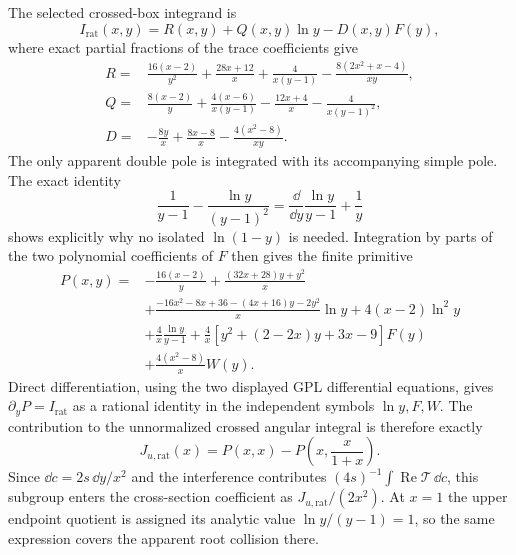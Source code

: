 The selected crossed-box integrand is
\begin{equation}
 I_{\mathrm{rat}}(x,y)=R(x,y)+Q(x,y)\ln y-D(x,y)F(y),
\end{equation}
where exact partial fractions of the trace coefficients give
\begin{align}
 R={}&\frac{16(x-2)}{y^2}+\frac{28x+12}{x}
       +\frac4{x(y-1)}-\frac{8(2x^2+x-4)}{xy},\\
 Q={}&\frac{8(x-2)}y+\frac{4(x-6)}{x(y-1)}
       -\frac{12x+4}{x}-\frac4{x(y-1)^2},\\
 D={}&-\frac{8y}x+\frac{8x-8}x-\frac{4(x^2-8)}{xy}.
\end{align}
The only apparent double pole is integrated with its accompanying
simple pole. The exact identity
\begin{equation}
 \frac1{y-1}-\frac{\ln y}{(y-1)^2}
 =\frac{\dd}{\dd y}\frac{\ln y}{y-1}+\frac1y
\end{equation}
shows explicitly why no isolated $\ln(1-y)$ is needed.
Integration by parts of the two polynomial coefficients of $F$
then gives the finite primitive
\begin{align}
 P(x,y)={}&-\frac{16(x-2)}y+\frac{(32x+28)y+y^2}{x}\\
 &+\frac{-16x^2-8x+36-(4x+16)y-2y^2}{x}\ln y
       +4(x-2)\ln^2y\\
 &+\frac4x\frac{\ln y}{y-1}
       +\frac4x[y^2+(2-2x)y+3x-9]F(y)\\
 &+\frac{4(x^2-8)}xW(y).
\end{align}
Direct differentiation, using the two displayed GPL differential
equations, gives $\partial_yP=I_{\mathrm{rat}}$ as a rational
identity in the independent symbols $\ln y,F,W$.
The contribution to the unnormalized crossed angular integral is
therefore exactly
\begin{equation}
 J_{u,\mathrm{rat}}(x)=P(x,x)-P\left(x,\frac{x}{1+x}\right).
\end{equation}
Since $\dd c=2s\,\dd y/x^2$ and the interference contributes
$(4s)^{-1}\int\operatorname{Re}\mathcal T\,\dd c$, this subgroup
enters the cross-section coefficient as $J_{u,\mathrm{rat}}/(2x^2)$.
At $x=1$ the upper endpoint quotient is assigned
its analytic value $\ln y/(y-1)=1$, so the same expression covers
the apparent root collision there.

